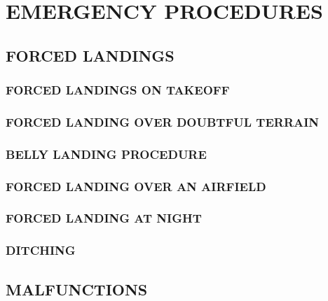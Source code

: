 \chapter{EMERGENCY PROCEDURES}
\minitoc{}
\cleardoublepage{}


\section{FORCED LANDINGS}
\subsection{FORCED LANDINGS ON TAKEOFF}
\subsection{FORCED LANDING OVER DOUBTFUL TERRAIN}
\subsection{BELLY LANDING PROCEDURE}
\subsection{FORCED LANDING OVER AN AIRFIELD}
\subsection{FORCED LANDING AT NIGHT}
\subsection{DITCHING}


\section{MALFUNCTIONS}
